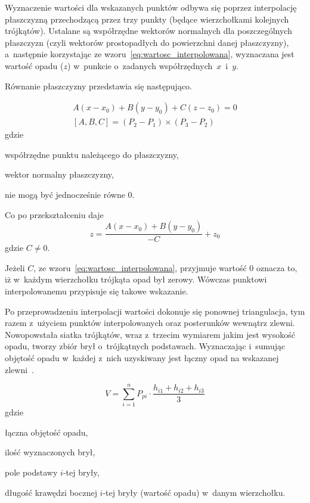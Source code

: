 Wyznaczenie wartości dla wskazanych punktów odbywa się poprzez interpolację płaszczyzną przechodzącą przez trzy punkty (będące wierzchołkami kolejnych trójkątów). Ustalane są współrzędne wektorów normalnych dla poszczególnych płaszczyzn (czyli wektorów prostopadłych do powierzchni danej płaszczyzny), a~następnie korzystając ze wzoru~\ref{eq:wartosc_interpolowana}, wyznaczana jest wartość opadu ($z$) w~punkcie o~zadanych współrzędnych~$x$~i~$y$.

Równanie płaszczyzny przedstawia się następująco.

\begin{equation}
\begin{gathered}
A(x - x_0) + B(y - y_0) + C(z - z_0) = 0 \\
[A, B, C] = (P_2 - P_1) \times (P_3 - P_2)
\label{eq:rownanie_plaszczyzny}
\end{gathered}
\end{equation}
gdzie
\begin{description}[leftmargin=3cm, itemsep=0cm, labelsep=0cm]
	\item[$x_0, y_0, z_0$] współrzędne punktu należącego do płaszczyzny,
	\item[{[}$A, B, C${]}] wektor normalny płaszczyzny, %
	\item[$A, B, C$] nie mogą być jednocześnie równe 0.
\end{description}
%
Co po przekształceniu daje
\begin{equation}
\label{eq:wartosc_interpolowana}
	z = \frac{A(x - x_0) + B(y - y_0)}{-C} + z_0
\end{equation}
gdzie $C \neq 0$.


Jeżeli $C$, ze wzoru~\ref{eq:wartosc_interpolowana}, przyjmuje wartość 0 oznacza to, iż w~każdym wierzchołku trójkąta opad był zerowy. Wówczas punktowi interpolowanemu przypisuje się takowe wskazanie.

Po przeprowadzeniu interpolacji wartości dokonuje się ponownej triangulacja, tym razem z~użyciem punktów interpolowanych oraz posterunków wewnątrz zlewni. Nowopowstała siatka trójkątów, wraz z~trzecim wymiarem jakim jest wysokość opadu, tworzy zbiór brył o~trójkątnych podstawach. Wyznaczając i~sumując objętość opadu w~każdej z~nich uzyskiwany jest łączny opad na wskazanej zlewni~\cite{matematyka_poradnik, mathMonthly}.

\begin{equation}
	V = \sum_{i=1}^{n}P_{pi} \cdot \frac{h_{i1}+h_{i2}+h_{i3}}{3}
\label{eq:opad_powierzchniowy}
\end{equation}
gdzie
\begin{description}[leftmargin=3cm, itemsep=0cm, labelsep=0cm]
	\item[$V$] łączna objętość opadu,
	\item[$n$] ilość wyznaczonych brył,
	\item[$P_{pi}$] pole podstawy $i$-tej bryły,
	\item[$h_{i1}, h_{i2}, h_{i3}$] długość krawędzi bocznej $i$-tej bryły (wartość opadu) w~danym wierzchołku.
\end{description}




